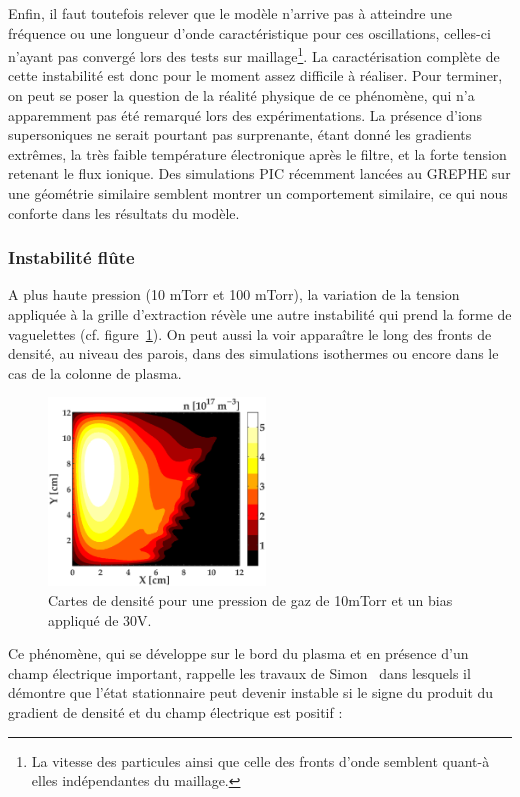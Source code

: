 \begin{refsection}
Enfin, il faut toutefois relever que le modèle n'arrive pas à atteindre 
une fréquence ou une longueur d'onde caractéristique pour ces oscillations,
celles-ci n'ayant pas convergé lors des tests sur maillage\footnote{La
vitesse des particules ainsi que celle des fronts d'onde semblent quant-à
elles indépendantes du maillage.}.
La caractérisation complète de cette instabilité est donc pour le moment
assez difficile à réaliser.
Pour terminer, on peut se poser la question de la réalité physique de
ce phénomène, qui n'a apparemment pas été remarqué lors des expérimentations. La
présence d'ions supersoniques ne serait pourtant pas surprenante, étant donné
les gradients extrêmes, la très faible température électronique 
après le filtre, et la forte tension retenant le flux ionique.
Des simulations PIC récemment lancées au GREPHE sur une géométrie similaire
semblent montrer un comportement similaire, ce qui nous conforte dans les
résultats du modèle.

	\subsubsection{Instabilité flûte}
	A plus haute pression (10 mTorr et 100 mTorr), la variation de la tension
	appliquée à la grille d'extraction révèle une autre instabilité qui prend la
	forme de vaguelettes (cf.
	figure~\ref{4-PegasesCarteDensiteVarBias5}). On peut aussi la voir apparaître
	le long des fronts de densité, au niveau des parois, dans des
	simulations isothermes ou encore dans le cas de la colonne de plasma.
		
\begin{figure}[!htbp]
  \centering
    \includegraphics[height=5cm]{figures/4-PegasesCarteDensiteVarBias5.eps}
    \caption{Cartes de densité pour une pression de gaz de 10mTorr et un bias
    appliqué de 30V.\label{4-PegasesCarteDensiteVarBias5}}
\end{figure}
	
	Ce phénomène, qui se développe sur le bord du plasma et
	en présence d'un champ électrique important, rappelle
	les travaux de Simon~\parencite{Simon63} dans lesquels il démontre que l'état
	stationnaire peut devenir instable si le signe du produit du
	gradient de densité et du champ électrique est positif :
	

\end{refsection}
